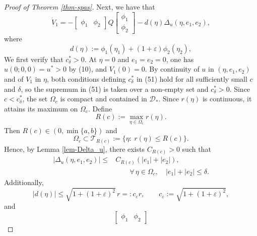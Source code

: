 \documentclass[journal,twoside,web]{ieeecolor}
\begin{document}
\begin{proof}[Proof of Theorem \ref{thm-spas}]
Next, we have that
\begin{equation}
\dot V_1
=
-\begin{bmatrix}\phi_1 & \phi_2\end{bmatrix}
Q
\begin{bmatrix}\phi_1\\ \phi_2\end{bmatrix}
-
d(\eta)
\Delta_u(\eta,e_1,e_2),
\end{equation}
where
\begin{equation}
d(\eta):=\phi_1(\eta_1)+(1+\varepsilon)\phi_2(\eta_2),
\end{equation}
We first verify that $c^*_\delta > 0$. At $\eta = 0$ and $e_1 = e_2 = 0$, one has $u(0;0,0) = u^* > 0$ by (10), and $V_1(0) = 0$. By continuity of $u$ in $(\eta,e_1,e_2)$ and of $V_1$ in $\eta$, both conditions defining $c^*_\delta$ in (51) hold for all sufficiently small $c$ and $\delta$, so the supremum in (51) is taken over a non-empty set and $c^*_\delta > 0$. Since $c<c_\delta^*$, the set $\Omega_c$ is compact and contained in $\mathcal D_*$. Since $r(\eta)$ is continuous, it attains its maximum on $\Omega_c$. Define
\begin{equation}
R(c):=\max_{\eta\in\Omega_c} r(\eta).
\end{equation}
Then $R(c)\in(0,\min\{a,b\})$ and
\begin{equation}
\Omega_c\subset \mathcal T_{R(c)}:=\{\eta:\ r(\eta)\le R(c)\}.
\end{equation}
Hence, by Lemma \ref{lem-Delta_u}, there exists $C_{R(c)}>0$ such that
\begin{align}
|\Delta_u(\eta,e_1,e_2)|\le& C_{R(c)}(|e_1|+|e_2|),\nonumber \\ &\qquad  \forall\,\eta\in\Omega_c,\quad |e_1|+|e_2|\le\delta.
\end{align}
Additionally,
\begin{equation}
|d(\eta)|
\le \sqrt{1+(1+\varepsilon)^2}\,r
=:c_\varepsilon r,
\qquad
c_\varepsilon:=\sqrt{1+(1+\varepsilon)^2}, 
\end{equation}
and
\begin{equation}
\begin{bmatrix}\phi_1 & \phi_2\end{bmatrix}

\end{equation}
\end{proof}
\end{document}
